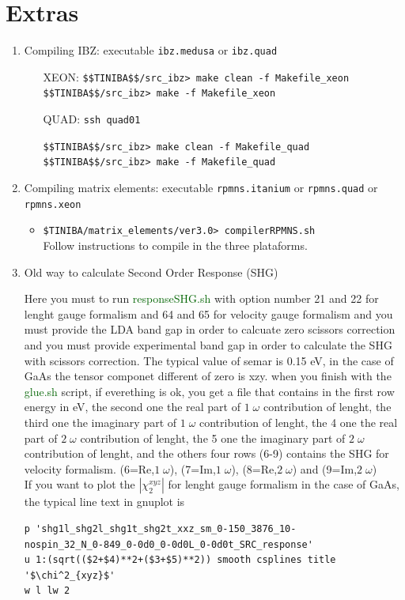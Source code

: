 \documentclass[openany,oneside]{book}
\numberwithin{equation}{section}
\begin{document}
\appendix
\chapter{Extras}
\begin{enumerate}
%
\item Compiling IBZ: executable \verb=ibz.medusa= or \verb=ibz.quad=
\begin{itemize}
\item[XEON:] \verb=$$TINIBA$$/src_ibz> make clean -f Makefile_xeon= 
\verb=$$TINIBA$$/src_ibz> make -f Makefile_xeon= 
\item[QUAD:]\verb=ssh quad01=

\verb=$$TINIBA$$/src_ibz> make clean -f Makefile_quad= 
\verb=$$TINIBA$$/src_ibz> make -f Makefile_quad= 
\end{itemize}
%
\item Compiling matrix elements: executable \verb=rpmns.itanium= or
  \verb=rpmns.quad= or \verb=rpmns.xeon=
\begin{itemize}
\item \verb=$TINIBA/matrix_elements/ver3.0> compilerRPMNS.sh=\\
Follow instructions to compile in the three plataforms.
\end{itemize}
%
\item Old way to calculate Second Order Response (SHG)
 
Here you must to run \textcolor{darkgreen}{responseSHG.sh} with option number 21 and 22 for lenght
 gauge formalism and 64 and 65 for velocity gauge formalism and you must provide the LDA band gap 
 in order to calcuate zero scissors correction and you must provide experimental band gap in order to 
calculate the SHG with scissors correction. The typical value of semar is 0.15 eV, in the case of GaAs 
 the tensor componet different of zero is xzy.
when you finish with the \textcolor{darkgreen}{glue.sh} script, if everething is ok, you get  a file
that contains in the first row energy in eV,  the second one the real part of $1\;\omega$ contribution of lenght, 
the third one the imaginary part of $1\;\omega$ contribution of lenght,  
the 4 one the real part of $2\;\omega$ contribution of lenght, 
the 5 one the imaginary part of $2\;\omega$ contribution of lenght, and the others four rows (6-9)
contains the SHG for velocity formalism. (6=Re,$1\;\omega$), (7=Im,$1\;\omega$), (8=Re,$2\;\omega$) and 
(9=Im,$2\;\omega$)\\
If you want to plot the $|\chi_2^{xyz}|$ for lenght gauge formalism in the case of GaAs, the typical line text in gnuplot is 
\begin{verbatim}
p 'shg1l_shg2l_shg1t_shg2t_xxz_sm_0-150_3876_10-
nospin_32_N_0-849_0-0d0_0-0d0L_0-0d0t_SRC_response'  
u 1:(sqrt(($2+$4)**2+($3+$5)**2)) smooth csplines title '$\chi^2_{xyz}$'
w l lw 2
\end{verbatim}


\end{enumerate}
\end{document}
